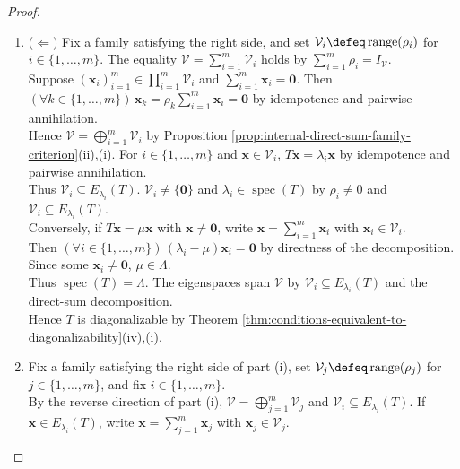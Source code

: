 \begin{theorem}
\begin{proof}
\begin{enumerate}[label=(\roman*)]
Thus $(\forall i,j\in\{1,\ldots,m\})\,[i\neq j\Rightarrow\rho_i\rho_j=0]$ and $\sum\limits_{i=1}^{m}\rho_i=I_{\mathcal{V}}$.\\
The identity $(\forall\mathbf{x}\in\mathcal{V})\,T\mathbf{x}=\sum\limits_{i=1}^{m}\lambda_i\mathbf{x}_i=\sum\limits_{i=1}^{m}\lambda_i\rho_i\mathbf{x}$ holds by the eigenspace identities and projection rule, so $T=\sum\limits_{i=1}^{m}\lambda_i\rho_i$.
\item[$(i)$] ($\Leftarrow$) Fix a family satisfying the right side, and set $\mathcal{V}_i\defeq\operatorname{range}(\rho_i)$ for $i\in\{1,\ldots,m\}$. The equality $\mathcal{V}=\sum\limits_{i=1}^{m}\mathcal{V}_i$ holds by $\sum\limits_{i=1}^{m}\rho_i=I_{\mathcal{V}}$.\\
Suppose $(\mathbf{x}_i)_{i=1}^{m}\in\prod\limits_{i=1}^{m}\mathcal{V}_i$ and $\sum\limits_{i=1}^{m}\mathbf{x}_i=\mathbf{0}$. Then $(\forall k\in\{1,\ldots,m\})\,\mathbf{x}_k=\rho_k\sum\limits_{i=1}^{m}\mathbf{x}_i=\mathbf{0}$ by idempotence and pairwise annihilation.\\
Hence $\mathcal{V}=\bigoplus\limits_{i=1}^{m}\mathcal{V}_i$ by Proposition \ref{prop:internal-direct-sum-family-criterion}(ii),(i). For $i\in\{1,\ldots,m\}$ and $\mathbf{x}\in\mathcal{V}_i$, $T\mathbf{x}=\lambda_i\mathbf{x}$ by idempotence and pairwise annihilation.\\
Thus $\mathcal{V}_i\subseteq E_{\lambda_i}(T)$. $\mathcal{V}_i\neq\{\mathbf{0}\}$ and $\lambda_i\in\operatorname{spec}(T)$ by $\rho_i\neq0$ and $\mathcal{V}_i\subseteq E_{\lambda_i}(T)$.\\
Conversely, if $T\mathbf{x}=\mu\mathbf{x}$ with $\mathbf{x}\neq\mathbf{0}$, write $\mathbf{x}=\sum\limits_{i=1}^{m}\mathbf{x}_i$ with $\mathbf{x}_i\in\mathcal{V}_i$.\\
Then $(\forall i\in\{1,\ldots,m\})\,(\lambda_i-\mu)\mathbf{x}_i=\mathbf{0}$ by directness of the decomposition. Since some $\mathbf{x}_i\neq\mathbf{0}$, $\mu\in\Lambda$.\\
Thus $\operatorname{spec}(T)=\Lambda$. The eigenspaces span $\mathcal{V}$ by $\mathcal{V}_i\subseteq E_{\lambda_i}(T)$ and the direct-sum decomposition.\\
Hence $T$ is diagonalizable by Theorem \ref{thm:conditions-equivalent-to-diagonalizability}(iv),(i).
\item[$(ii)$] Fix a family satisfying the right side of part (i), set $\mathcal{V}_j\defeq\operatorname{range}(\rho_j)$ for $j\in\{1,\ldots,m\}$, and fix $i\in\{1,\ldots,m\}$.\\
By the reverse direction of part (i), $\mathcal{V}=\bigoplus\limits_{j=1}^{m}\mathcal{V}_j$ and $\mathcal{V}_i\subseteq E_{\lambda_i}(T)$. If $\mathbf{x}\in E_{\lambda_i}(T)$, write $\mathbf{x}=\sum\limits_{j=1}^{m}\mathbf{x}_j$ with $\mathbf{x}_j\in\mathcal{V}_j$.\\

\end{enumerate}
\end{proof}
\end{theorem}
